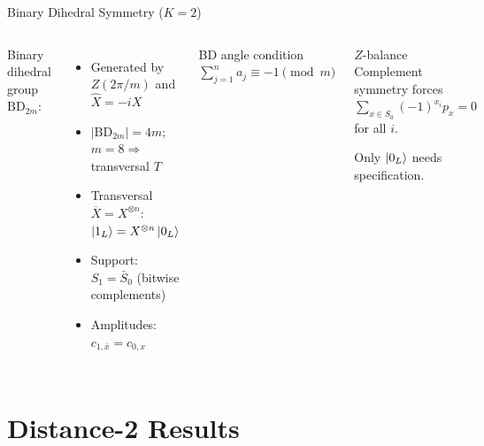 \documentclass[aspectratio=169,t]{beamer}
\begin{document}
\begin{frame}{Binary Dihedral Symmetry ($K{=}2$)}

\begin{columns}[T]
Binary dihedral group $\mathrm{BD}_{2m}$:
\begin{itemize}
\item Generated by $Z(2\pi/m)$ and $\hat{X}=-iX$
\item $|\mathrm{BD}_{2m}|=4m$;\quad $m{=}8 \Rightarrow$ transversal $T$
\item Transversal $\overline{X}=X^{\otimes n}$: 
  $\ket{1_L} = X^{\otimes n}\ket{0_L}$
\item Support: $S_1 = \bar{S}_0$  (bitwise complements)
\item Amplitudes: $c_{1,\bar{x}}=c_{0,x}$
\end{itemize}

\begin{block}{BD angle condition}
$\sum_{j=1}^{n} a_j \equiv  -1 \pmod{m}$
\end{block}

\begin{exampleblock}{$Z$-balance}
Complement symmetry forces\\
$\sum_{x\in S_0}(-1)^{x_i}p_x = 0$
for all $i$.

Only $\ket{0_L}$ needs specification.
\end{exampleblock}
\end{columns}
\end{frame}

\section{Distance-2 Results}
\end{document}
